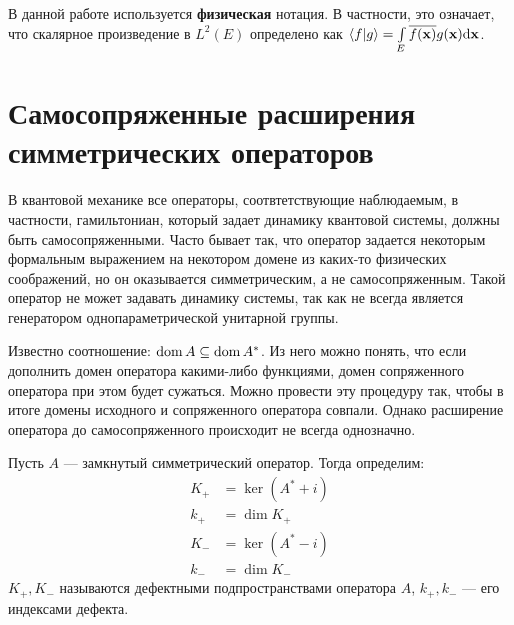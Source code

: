 В данной работе используется \textbf{физическая} нотация. В частности, это означает, что скалярное произведение в $L^2(E)$ определено как $\ip{f}{g} = \int\limits_E \cconj{f(\vb{x})} g(\vb{x}) \dd \vb{x}$.


\section{Самосопряженные расширения симметрических операторов}
В квантовой механике все операторы, соотвтетствующие наблюдаемым, в частности, гамильтониан, который задает динамику квантовой системы, должны быть самосопряженными. Часто бывает так, что оператор задается некоторым формальным выражением на некотором домене из каких-то физических соображений, но он оказывается симметрическим, а не самосопряженным. Такой оператор не может задавать динамику системы, так как не всегда является генератором однопараметрической унитарной группы.

Известно соотношение: $\operatorname{dom} A \subseteq \operatorname{dom} A^*$. Из него можно понять, что если дополнить домен оператора какими-либо функциями, домен сопряженного оператора при этом будет сужаться. Можно провести эту процедуру так, чтобы в итоге домены исходного и сопряженного оператора совпали. Однако расширение оператора до самосопряженного происходит не всегда однозначно.

Пусть $A$ — замкнутый симметрический оператор. Тогда определим:
\begin{align*}
K_+ &= \ker (A^* + i) \\
k_+ &= \dim K_+ \\
K_- &= \ker (A^* - i) \\
k_- &= \dim K_-
\end{align*}
$K_+, K_-$ называются дефектными подпространствами оператора $A$, $k_+, k_-$ — его индексами дефекта.

